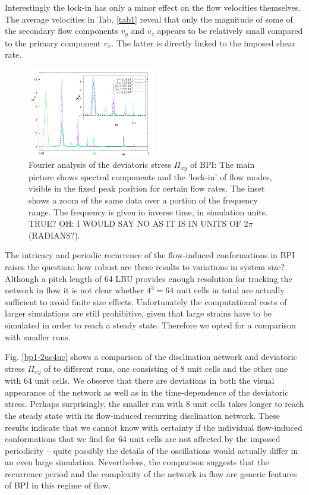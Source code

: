 \documentclass[aps,pre,reprint,superscriptaddress, twocolumn]{revtex4}
\begin{document}
Interestingly the lock-in has only a minor effect on the flow velocities themselves.
The average velocities in Tab. \ref{tab1} reveal that only the magnitude of some of the secondary 
flow components $v_y$ and $v_z$ appears to be relatively small compared to the primary component $v_x$. 
The latter is directly linked to the imposed shear rate. 

\begin{figure}[htpb]
\includegraphics[width=0.495\textwidth]{spectrum_bp1.pdf}
\caption{Fourier analysis of the deviatoric stress $\Pi_{xy}$ of BPI: The main picture shows 
spectral components and the 'lock-in' of flow modes, 
visible in the fixed peak position for certain flow rates.  
The inset shows a zoom of the same data over 
a portion of the frequency range.
The frequency is given in inverse time, in simulation units. TRUE?
OH: I WOULD SAY NO AS IT IS IN UNITS OF 2$\pi$ (RADIANS?).}
\label{bp1-spectrum}
\end{figure}

The intricacy and periodic recurrence of the flow-induced conformations 
in BPI raises the question: how robust are these results to variations in 
system size? Although a pitch length of 64 LBU provides enough resolution 
for tracking the network in flow it is not clear whether $4^3=64$ unit cells 
in total are actually sufficient to avoid finite size effects.
Unfortunately the computational costs of larger simulations are still
prohibitive, given that large strains have to
be simulated in order to reach a steady state. Therefore we opted for a 
comparison with smaller runs.

Fig. \ref{bp1-2uc4uc} shows a comparison of the disclination network and 
deviatoric stress $\Pi_{xy}$ of to different runs, one consisting of 8 
unit cells and the other one with 64 unit cells.
We observe that there are deviations in both the visual appearance of the 
network as well as in the time-dependence of the deviatoric stress.
Perhaps surprisingly, the smaller run with 8 unit cells takes longer 
to reach the steady state with its flow-induced recurring disclination network. 
These results indicate that we cannot know with certainty if the individual 
flow-induced conformations that we find for 64 unit cells are not affected 
by the imposed periodicity -- quite possibly the details of the oscillations
would actually differ in an even large simulation. 
Nevertheless, the comparison suggests that 
the recurrence period and the complexity of the network in flow are  
generic features of BPI in this regime of flow.
 
\end{document}
